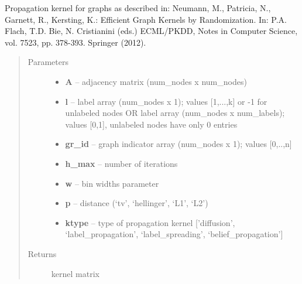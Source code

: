 \documentclass[letterpaper,10pt,english]{sphinxmanual}
\begin{document}
\begin{fulllineitems}
\label{pyGPs.GraphExtensions:pyGPs.GraphExtensions.graphKernels.propagationKernel}
Propagation kernel for graphs as described in: 
Neumann, M., Patricia, N., Garnett, R., Kersting, K.: Efficient Graph Kernels by 
Randomization. In: P.A. Flach, T.D. Bie, N. Cristianini (eds.) ECML/PKDD, Notes in 
Computer Science, vol. 7523, pp. 378-393. Springer (2012).
\begin{quote}\begin{description}
\item[{Parameters}] \leavevmode\begin{itemize}
\item {} 
\textbf{A} -- adjacency matrix (num\_nodes x num\_nodes)

\item {} 
\textbf{l} -- label array (num\_nodes x 1); values {[}1,...,k{]} or -1 for unlabeled nodes 
OR label array (num\_nodes x num\_labels); values {[}0,1{]}, unlabeled nodes have only 0 entries

\item {} 
\textbf{gr\_id} -- graph indicator array (num\_nodes x 1); values {[}0,..,n{]}

\item {} 
\textbf{h\_max} -- number of iterations

\item {} 
\textbf{w} -- bin widths parameter

\item {} 
\textbf{p} -- distance (`tv', `hellinger', `L1', `L2')

\item {} 
\textbf{ktype} -- type of propagation kernel {[}'diffusion', `label\_propagation', `label\_spreading', `belief\_propagation'{]}

\end{itemize}

\item[{Returns}] \leavevmode
kernel matrix

\end{description}\end{quote}

\end{fulllineitems}
\end{document}
